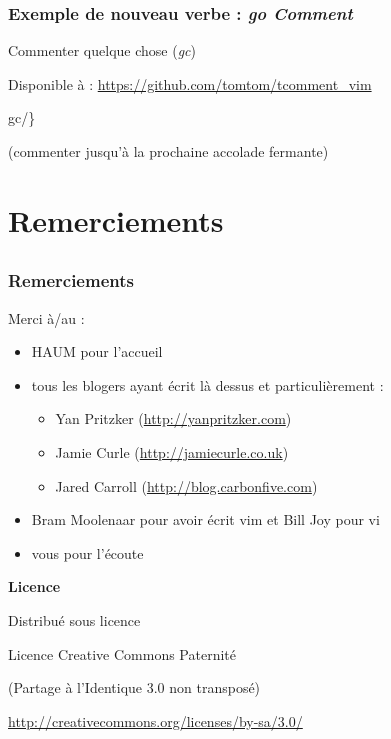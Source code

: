 \documentclass{beamer}
\begin{document}
\begin{frame}
\frametitle{Exemple de nouveau verbe : {\it go Comment}}

Commenter quelque chose ({\it gc})

Disponible à : \url{https://github.com/tomtom/tcomment_vim}
\pause{}

\begin{center}
    gc/\}
    \pause{}

    (commenter jusqu'à la prochaine accolade fermante)
\end{center}
    
\end{frame}

\section{Remerciements}
\subsection{}
\frame{\tableofcontents[currentsection]}

\begin{frame}
\frametitle{Remerciements}

Merci à/au :

\begin{itemize}
    \item HAUM pour l'accueil
    \item tous les blogers ayant écrit là dessus et particulièrement :
    \begin{itemize}
        \item Yan Pritzker (\url{http://yanpritzker.com})
        \item Jamie Curle (\url{http://jamiecurle.co.uk})
        \item Jared Carroll (\url{http://blog.carbonfive.com})
    \end{itemize}
    \item Bram Moolenaar pour avoir écrit vim et Bill Joy pour vi
    \item vous pour l'écoute
\end{itemize}

{\bf Licence}

\begin{center}
    Distribué sous licence

    Licence Creative Commons Paternité
    
    (Partage à l'Identique 3.0 non transposé)

    \url{http://creativecommons.org/licenses/by-sa/3.0/}
\end{center}
\end{frame}
\end{document}
